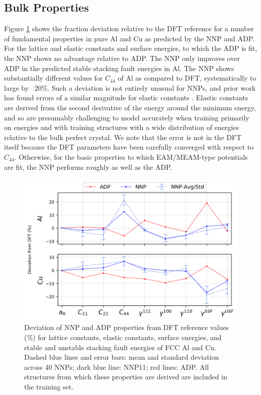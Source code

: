 \documentclass{article}
\begin{document}
\subsection{Bulk Properties} \label{sct:bulk_properties}

Figure \ref{fig:matparam_purestats} shows the fraction deviation relative to the DFT reference for a number of fundamental properties in pure Al and Cu as predicted by the NNP and ADP.  For the lattice and elastic constants and surface energies, to which the ADP is fit, the NNP shows no advantage relative to ADP.  The NNP only improves over ADP in the predicted stable stacking fault energies in Al.
The NNP shows substantially different values for $C_{44}$ of Al as compared to DFT, systematically to large by ~20\%.  Such a deviation is not entirely unusual for NNPs, and prior work has found errors of a similar magnitude for elastic constants \cite{Zuo2020APotentials}.
Elastic constants are derived from the second derivative of the energy around the minimum energy, and so are presumably challenging to model accurately
when training primarily on energies and with training structures with a wide distribution of energies relative to the bulk perfect crystal.  
We note that the error is not in the DFT itself because the DFT parameters have been carefully converged with respect to $C_{44}$.  Otherwise, for the basic properties to which EAM/MEAM-type potentials are fit, the NNP performs roughly as well as the ADP.

\begin{figure}[H]%
\centering%
\includegraphics[width=1\textwidth,center]{./figures/matparam_purestats.png}%
\caption{Deviation of NNP and ADP properties from DFT reference values (\%) for lattice constants, elastic constants, surface energies, and stable and unstable stacking fault energies of FCC Al and Cu.  Dashed blue lines and error bars: mean and standard deviation across 40 NNPs; dark blue line: NNP11; red lines: ADP.  
All structures from which these properties are derived are included in the training set. }%
\label{fig:matparam_purestats}
\end{figure}
\end{document}

